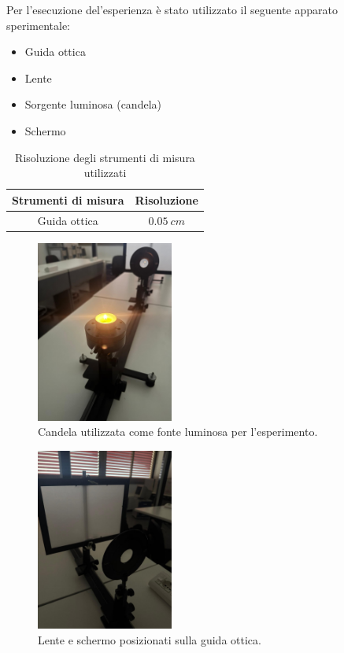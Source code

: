 Per l'esecuzione del'esperienza è stato utilizzato il seguente apparato sperimentale:
\begin{itemize}
	\item Guida ottica
	\item Lente
	\item Sorgente luminosa (candela)
	\item Schermo
\end{itemize}

\begin{table}[H]
	\centering
	\begin{tabular}{|c|c|}
		\hline
		\textbf{Strumenti di misura} & \textbf{Risoluzione} \\
		\hline
		Guida ottica & $0.05\ cm$ \\
		\hline
	\end{tabular}
	\caption{Risoluzione degli strumenti di misura utilizzati}
	\label{tab:}
\end{table}

\begin{figure}[H]
	\centering
	\includegraphics[width=0.4\textwidth]{./lucina}
	\caption{Candela utilizzata come fonte luminosa per l'esperimento.}
\end{figure}

\begin{figure}[H]
	\centering
	\includegraphics[width=0.4\textwidth]{./lente}
	\caption{Lente e schermo posizionati sulla guida ottica.}
\end{figure}